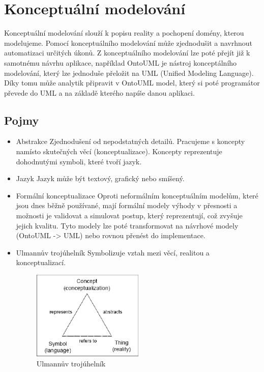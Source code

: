\documentclass{szzclass}
\begin{document}
\tableofcontents
\newpage

\section{Konceptuální modelování}

Konceptuální modelování slouží k popisu reality a pochopení domény, kterou modelujeme.
Pomocí konceptuálního modelování může zjednodušit a navrhnout automatizaci určitých úkonů.
Z konceptuálního modelování lze poté přejít již k samotnému návrhu aplikace, například OntoUML je nástroj konceptálního modelování,
který lze jednoduše přeložit na UML (Unified Modeling Language). Díky tomu může analytik připravit v OntoUML model, který si
poté programátor převede do UML a na základě kterého napíše danou aplikaci.

\subsection{Pojmy}

\begin{itemize}
    \item Abstrakce
          Zjednodušení od nepodstatných detailů. Pracujeme s koncepty namísto skutečných věcí (konceptualizace).
          Koncepty reprezentuje dohodnutými symboli, které tvoří jazyk.
    \item Jazyk
          Jazyk může být textový, grafický nebo smíšený.
    \item Formální konceptualizace
          Oproti neformálním konceptuálním modelům, které jsou dnes běžně používané, mají formální modely
          výhody v přesnosti a možnosti je validovat a simulovat postup, který reprezentují, což zvyšuje jejich kvalitu.
          Tyto modely lze poté transformovat na návrhové modely (OntoUML -> UML) nebo rovnou přenést do implementace.
    \item Ulmannův trojúhelník
          Symbolizuje vztah mezi věcí, realitou a konceptualizací.
          \begin{figure}[ht]
            \centering
            \includegraphics[width=0.5\textwidth]{topics/bi-wsi-si-05/ulmanns_triangle.png}
            \caption{Ulmannův trojúhelník}
          \end{figure}
\end{itemize}
\end{document}
